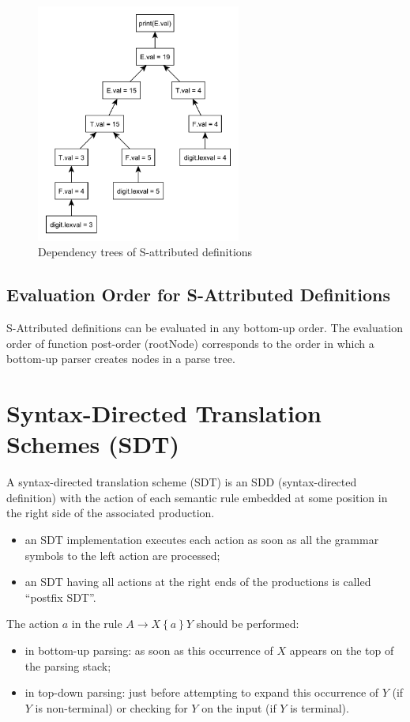 \begin{figure}[H]
	\centerline{\includegraphics[width=0.6\textwidth]{img/14.pdf}}
	\caption{Dependency trees of S-attributed definitions}
\end{figure}

\subsection{Evaluation Order for S-Attributed Definitions}
S-Attributed definitions can be evaluated in any bottom-up order.
The evaluation order of function post-order (rootNode) corresponds to the order in which a bottom-up parser creates nodes in a parse tree.

\section{Syntax-Directed Translation Schemes (SDT)}
A syntax-directed translation scheme (SDT) is an SDD (syntax-directed definition) with the action of each semantic rule embedded at some position in the right side of the associated production.
\begin{itemize}
	\item an SDT implementation executes each action as soon as all the grammar symbols to the left action are processed;
	\item an SDT having all actions at the right ends of the productions is called ``postfix SDT''.
\end{itemize}

The action $a$ in the rule $A \to X\left\{a\right\}Y$ should be performed:
\begin{itemize}
	\item in bottom-up parsing: as soon as this occurrence of $X$ appears on the top of the parsing stack;
	\item in top-down parsing: just before attempting to expand this occurrence of $Y$ (if $Y$ is non-terminal) or checking for $Y$ on the input (if $Y$ is terminal).
\end{itemize}

